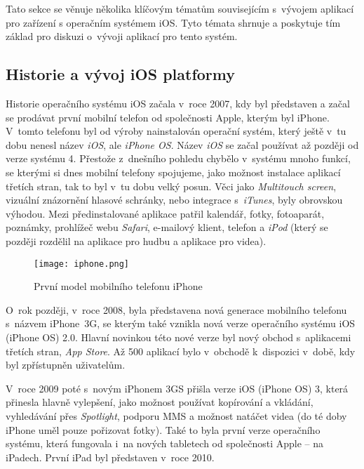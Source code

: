 Tato sekce se věnuje několika klíčovým tématům souvisejícím s~vývojem aplikací pro zařízení s operačním systémem iOS. Tyto témata shrnuje a poskytuje tím základ pro diskuzi o~vývoji aplikací pro tento systém.

\subsection{Historie a vývoj iOS platformy}

Historie operačního systému iOS začala v~roce 2007, kdy byl představen a začal se prodávat první mobilní telefon od společnosti Apple, kterým byl iPhone. V~tomto telefonu byl od výroby nainstalován operační systém, který ještě v~tu dobu nenesl název \emph{iOS}, ale \emph{iPhone OS}. Název \emph{iOS} se začal používat až později od verze systému 4. Přestože z~dnešního pohledu chybělo v~systému mnoho funkcí, se kterými si dnes mobilní telefony spojujeme, jako možnost instalace aplikací třetích stran, tak to byl v~tu dobu velký posun. Věci jako \emph{Multitouch screen}, vizuální znázornění hlasové schránky, nebo integrace s~\emph{iTunes}, byly obrovskou výhodou. Mezi předinstalované aplikace patřil kalendář, fotky, fotoaparát, poznámky, prohlížeč webu \emph{Safari}, e-mailový klient, telefon a \emph{iPod} (který se později rozdělil na aplikace pro hudbu a aplikace pro videa).

\begin{figure}[h]
	\centering
	\texttt{[image: iphone.png]}
	\caption{První model mobilního telefonu iPhone \cite{iphone-review}}
\end{figure}

O~rok později, v~roce 2008, byla představena nová generace mobilního telefonu s~názvem iPhone~3G, se kterým také vznikla nová verze operačního systému iOS (iPhone OS) 2.0. Hlavní novinkou této nové verze byl nový obchod s~aplikacemi třetích stran, \emph{App Store}. Až 500 aplikací bylo v~obchodě k~dispozici v~době, kdy byl zpřístupněn uživatelům.

V~roce 2009 poté s~novým iPhonem 3GS přišla verze iOS (iPhone OS) 3, která přinesla hlavně vylepšení, jako možnost používat kopírování a vkládání, vyhledávání přes \emph{Spotlight}, podporu MMS a možnost natáčet videa (do té doby iPhone uměl pouze pořizovat fotky). Také to byla první verze operačního systému, která fungovala i~na nových tabletech od společnosti Apple – na iPadech. První iPad byl představen v~roce 2010.


